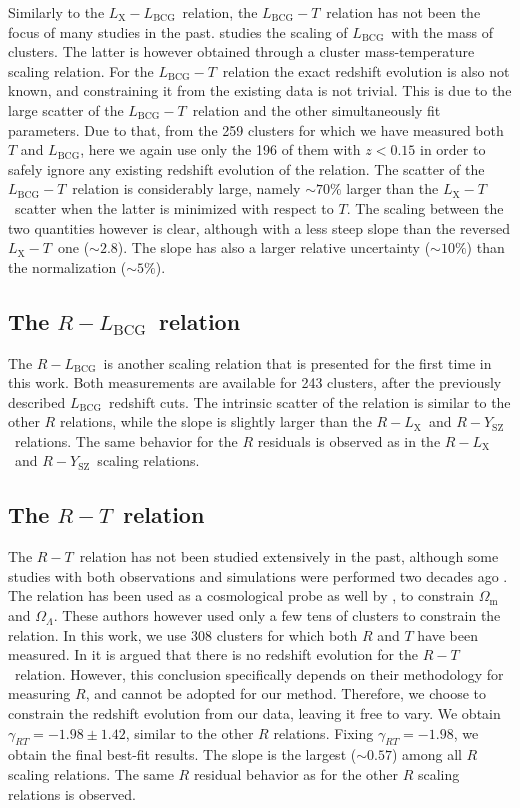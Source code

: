 \documentclass{aa}   %
\newcommand{\LT}{$L_{\text{X}}-T$}
\newcommand{\LbcgT}{$L_{\text{BCG}}-T$}
\newcommand{\LxLbcg}{$L_{\text{X}}-L_{\text{BCG}}$}
\newcommand{\RL}{$R-L_{\text{X}}$}
\newcommand{\RY}{$R-Y_{\text{SZ}}$}
\newcommand{\RLbcg}{$R-L_{\text{BCG}}$}
\newcommand{\RT}{$R-T$}
\newcommand{\Lbcg}{$L_{\text{BCG}}$}
\begin{document}
Similarly to the \LxLbcg\ relation, the \LbcgT\ relation has not been the focus of many studies in the past. \citet{bharad14} studies the scaling of \Lbcg\ with the mass of clusters. The latter is however obtained through a cluster mass-temperature scaling relation. For the \LbcgT\ relation the exact redshift evolution is also not known, and constraining it from the existing data is not trivial. This is due to the large scatter of the \LbcgT\ relation and the other simultaneously fit parameters. Due to that, from the 259 clusters for which we have measured both $T$ and \Lbcg, here we again use only the 196 of them with $z<0.15$ in order to safely ignore any existing redshift evolution of the relation. The scatter of the \LbcgT\ relation is considerably large, namely $\sim 70\%$ larger than the \LT\ scatter when the latter is minimized with respect to $T$. The scaling between the two quantities however is clear, although with a less steep slope than the reversed \LT\ one ($\sim 2.8$). The slope has also a larger relative uncertainty ($\sim 10\%$) than the normalization ($\sim5\%$). 

\subsection{The \RLbcg\ relation}

The \RLbcg\ is another scaling relation that is presented for the first time in this work. Both measurements are available for 243 clusters, after the previously described \Lbcg\ redshift cuts. The intrinsic scatter of the relation is similar to the other $R$ relations, while the slope is slightly larger than the \RL\ and \RY\ relations. The same behavior for the $R$ residuals is observed as in the \RL\ and \RY\ scaling relations.

\subsection{The \RT\ relation}

The \RT\ relation has not been studied extensively in the past, although some studies with both observations and simulations were performed two decades ago \citep{mohr97,mohr,verde}. The relation has been used as a cosmological probe as well by \citet{mohr}, to constrain $\Omega_{\text{m}}$ and  $\Omega_{\Lambda}$. These authors however used only a few tens of clusters to constrain the relation. In this work, we use 308 clusters for which both $R$ and $T$ have been measured. In \citet{mohr} it is argued that there is no redshift evolution for the \RT\ relation. However, this conclusion specifically depends on their methodology for measuring $R$, and cannot be adopted for our method. Therefore, we choose to constrain the redshift evolution from our data, leaving it free to vary. We obtain $\gamma_{RT}=-1.98\pm 1.42$, similar to the other $R$ relations. Fixing $\gamma_{RT}=-1.98$, we obtain the final best-fit results. The slope is the largest ($\sim 0.57$) among all $R$ scaling relations. The same $R$ residual behavior as for the other $R$ scaling relations is observed. 
\end{document}
